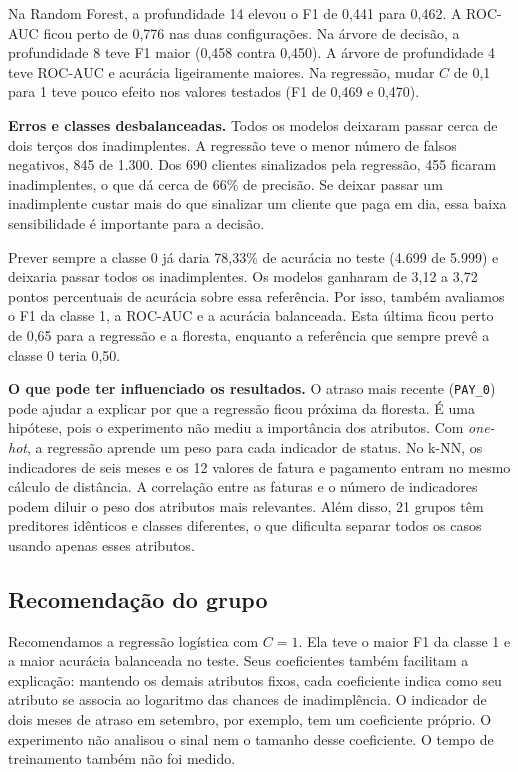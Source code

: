 \documentclass[11pt,a4paper]{article}
\newcommand{\status}[1]{\texttt{PAY\_#1}}
\begin{document}
Na Random Forest, a profundidade 14 elevou o F1 de 0,441 para 0,462.
A ROC-AUC ficou perto de 0,776 nas duas configurações. Na árvore de
decisão, a profundidade 8 teve F1 maior (0,458 contra 0,450).
A árvore de profundidade 4 teve ROC-AUC e acurácia ligeiramente maiores.
Na regressão, mudar $C$ de 0,1 para 1 teve pouco efeito nos valores testados
(F1 de 0,469 e 0,470).

\newpage
\textbf{Erros e classes desbalanceadas.}
Todos os modelos deixaram passar cerca de dois terços dos inadimplentes.
A regressão teve o menor número de falsos negativos, 845 de 1.300.
Dos 690 clientes sinalizados pela regressão, 455 ficaram inadimplentes,
o que dá cerca de 66\% de precisão. Se deixar passar um inadimplente
custar mais do que sinalizar um cliente que paga em dia, essa baixa
sensibilidade é importante para a decisão.

Prever sempre a classe 0 já daria 78,33\% de acurácia no teste (4.699 de
5.999) e deixaria passar todos os inadimplentes. Os modelos ganharam
de 3,12 a 3,72 pontos percentuais de acurácia sobre essa referência.
Por isso, também avaliamos o F1 da classe 1, a ROC-AUC e a acurácia
balanceada. Esta última ficou perto de 0,65 para a regressão e a
floresta, enquanto a referência que sempre prevê a classe 0 teria 0,50.

\textbf{O que pode ter influenciado os resultados.}
O atraso mais recente (\status{0}) pode ajudar a explicar por que a
regressão ficou próxima da floresta. É uma hipótese, pois o experimento
não mediu a importância dos atributos. Com \textit{one-hot}, a regressão
aprende um peso para cada indicador de status. No k-NN, os indicadores
de seis meses e os 12 valores de fatura e pagamento entram no mesmo
cálculo de distância. A correlação entre as faturas e o número de
indicadores podem diluir o peso dos atributos mais relevantes. Além
disso, 21 grupos têm preditores idênticos e classes diferentes, o que
dificulta separar todos os casos usando apenas esses atributos.

\subsection*{Recomendação do grupo}
Recomendamos a regressão logística com $C=1$. Ela teve o maior F1 da
classe 1 e a maior acurácia balanceada no teste. Seus coeficientes
também facilitam a explicação: mantendo os demais atributos fixos, cada
coeficiente indica como seu atributo se associa ao logaritmo das chances
de inadimplência. O indicador de dois meses de atraso em setembro, por
exemplo, tem um coeficiente próprio. O experimento não analisou o
sinal nem o tamanho desse coeficiente. O tempo de treinamento também
não foi medido.
\end{document}
